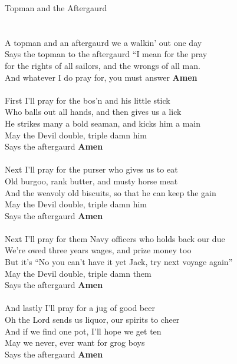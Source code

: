 \documentclass[letterpaper,9pt]{article}
\begin{document}
\newpage
{}
\huge
Topman and the Aftergaurd\\
\\
\LARGE
\\A topman and an aftergaurd we a walkin' out one day
\\Says the topman to the aftergaurd “I mean for the pray
\\for the rights of all sailors, and the wrongs of all man.
\\And whatever I do pray for, you must answer \textbf{Amen}
\\
\\First I'll pray for the bos'n and his little stick
\\Who balls out all hands, and then gives us a lick
\\He strikes many a bold seaman, and kicks him a main
\\May the Devil double, triple damn him
\\Says the aftergaurd \textbf{Amen}
\\
\\Next I'll pray for the purser who gives us to eat
\\Old burgoo, rank butter, and musty horse meat
\\And the weavoly old biscuits, so that he can keep the gain
\\May the Devil double, triple damn him
\\Says the aftergaurd \textbf{Amen}
\\
\\Next I'll pray for them Navy officers who holds back our due
\\We're owed three years wages, and prize money too
\\But it's “No you can't have it yet Jack, try next voyage again”
\\May the Devil double, triple damn them
\\Says the aftergaurd \textbf{Amen}
\\
\\And lastly I'll pray for a jug of good beer
\\Oh the Lord sends us liquor, our spirits to cheer
\\And if we find one pot, I'll hope we get ten
\\May we never, ever want for grog boys
\\Says the aftergaurd \textbf{Amen}
\end{document}
